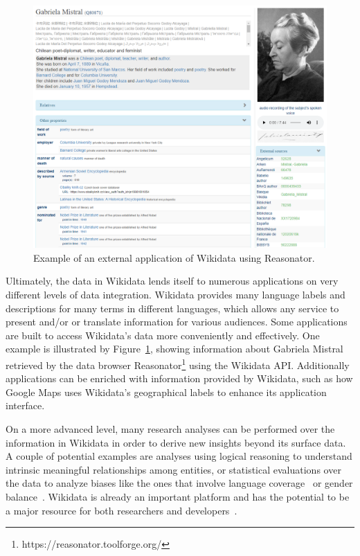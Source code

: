 \begin{figure}[!h]
    \centering
    \includegraphics[scale=.5]{imagenes/2_theorical_framework/wikidataReasonatorExample.PNG}
    \caption{Example of an external application of Wikidata using Reasonator.}
    \label{fig:wikidataReasonator}
\end{figure}

Ultimately, the data in Wikidata lends itself to numerous applications on very different levels 
of data integration. Wikidata provides many language labels and descriptions for many terms in 
different languages, which allows any service to present and/or or translate information for 
various audiences. Some applications are built to access Wikidata’s data more conveniently and 
effectively. One example is illustrated by Figure~\ref{fig:wikidataReasonator}, showing 
information about Gabriela Mistral retrieved by the data browser 
Reasonator\footnote{https://reasonator.toolforge.org/} using the Wikidata API. Additionally 
applications can be enriched with information provided by Wikidata, such as how Google Maps 
uses Wikidata’s geographical labels to enhance its application interface. 

On a more advanced level, many research analyses can be performed over the information in 
Wikidata in order to derive new insights beyond its surface data. A couple of potential examples 
are analyses using logical reasoning to understand intrinsic meaningful relationships among 
entities, or statistical evaluations over the data to analyze biases like the ones that involve 
language coverage~\cite{key:wikidataHale13} or gender balance~\cite{key:socialWikidataWagner16}. 
Wikidata is already an important platform and has the potential to be a major resource for both 
researchers and developers~\cite{wikidata:GeneWikiInitiative, wikidata:RiseWikidataVrandecic6682924}.
